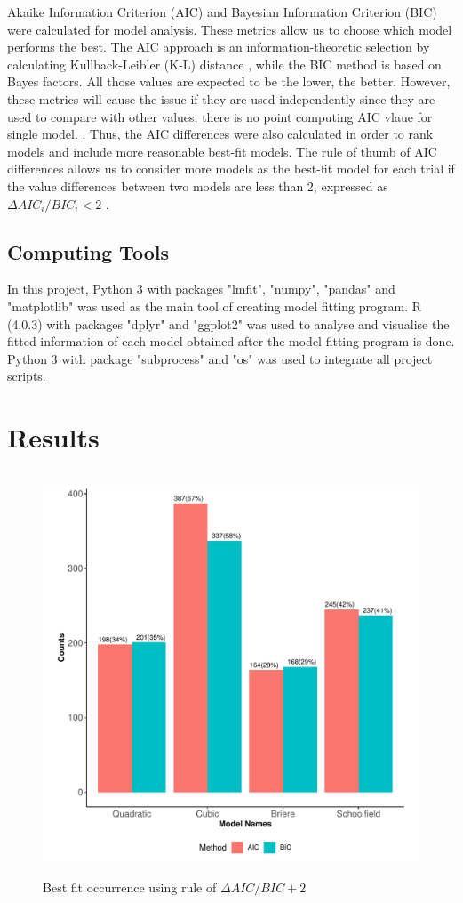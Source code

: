 \documentclass[11pt]{article}
\begin{document}
Akaike Information Criterion (AIC) and Bayesian Information Criterion (BIC) were calculated for model analysis. These metrics allow us to choose which model performs the best. The AIC approach is an information-theoretic selection by calculating Kullback-Leibler (K-L) distance \cite{burnham_anderson_2004} \cite{burnham_anderson2010}, while the BIC method is based on Bayes factors. All those values are expected to be the lower, the better. However, these metrics will cause the issue if they are used independently since they are used to compare with other values, there is no point computing AIC vlaue for single model. \cite{guthery_2003}. Thus, the AIC differences were also calculated in order to rank models and include more reasonable best-fit models. The rule of thumb of AIC differences allows us to consider more models as the best-fit model for each trial if the value differences between two models are less than 2, expressed as $ \Delta AIC_i/BIC_i < 2$ \cite{burnham_anderson2010}.


\subsection{Computing Tools}

In this project, Python 3 with packages "lmfit", "numpy", "pandas" and "matplotlib" was used as the main tool of creating model fitting program. R (4.0.3) with packages "dplyr" and "ggplot2" was used to analyse and visualise the fitted information of each model obtained after the model fitting program is done. Python 3 with package "subprocess" and "os" was used to integrate all project scripts.

\section{Results}
\begin{figure}[H]
    \centering
    \includegraphics[width = 15cm, height = 12cm]{../Results/Results_backup/images/bestfit_total_rule2.pdf}
    \caption{Best fit occurrence using rule of $\Delta AIC/BIC + 2$}
\end{figure}
\end{document}
